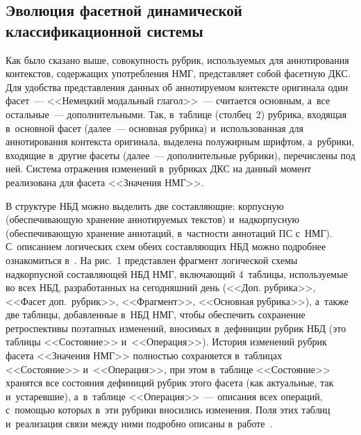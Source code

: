 \begin{multicols}{2}
\section{Эволюция фасетной динамической 
классификационной системы}

  Как было сказано выше, совокупность руб\-рик, используемых для 
аннотирования контекстов, содержащих упо\-треб\-ле\-ния НМГ, пред\-став\-ля\-ет 
собой фасетную ДКС. Для удобства представления данных об 
аннотируемом контексте оригинала один фасет~--- <<Немецкий модальный 
 глагол>>~--- считается основным, а~все остальные~--- дополнительными. 
Так, в~таблице (столбец~2) руб\-ри\-ка, входящая в~основной фасет (далее~--- 
основная руб\-ри\-ка) и~использованная для аннотирования кон\-текс\-та 
оригинала, выделена полужирным \mbox{шриф\-том}, а~руб\-ри\-ки, входящие в~другие 
фасеты (далее~--- дополнительные руб\-ри\-ки), перечислены под ней. Сис\-те\-ма 
отражения изменений в~руб\-ри\-ках ДКС на данный момент реализована для 
фасета <<Значения НМГ>>.
{

}
  
  В структуре НБД можно выделить две со\-став\-ля\-ющие: корпусную 
(обеспечивающую хранение аннотируемых текс\-тов) и~надкорпусную 
(обеспечивающую хранение аннотаций, в~част\-ности аннотаций ПС с~НМГ). 
С~описанием логических схем обеих со\-став\-ля\-ющих НБД можно подробнее 
ознакомиться в~\cite{20-go}. На рис.~1 пред\-став\-лен фрагмент логической 
схемы надкорпусной со\-став\-ля\-ющей НБД НМГ, включающий 4~таб\-ли\-цы, 
используемые во всех НБД, разработанных на сегодняшний день (<<Доп. 
рубрика>>, <<Фасет доп.\ руб\-рик>>, <<Фрагмент>>, <<Основная 
рубрика>>), а~так\-же две таб\-ли\-цы, до\-бав\-лен\-ные в~НБД НМГ, чтобы 
обеспечить сохранение ретроспективы поэтапных изменений, вносимых 
в~дефиниции рубрик НБД (это таб\-ли\-цы <<Со\-сто\-яние>> и~<<Операция>>). 
История изменений руб\-рик фасета <<Значения НМГ>> полностью 
сохраняется в~таб\-ли\-цах <<Со\-сто\-яние>> и~<<Операция>>, при этом 
в~таб\-ли\-це <<Со\-сто\-яние>> хранятся все со\-сто\-яния дефиниций руб\-рик этого 
фасета (как актуальные, так и~устаревшие), а~в~таб\-ли\-це <<Операция>>~--- 
описания всех операций, с~по\-мощью которых в~эти рубрики вносились 
изменения. Поля этих таб\-лиц и~реализация связи между ними подробно 
описаны в~работе~\cite{3-go}.
  
\begin{figure*} %
\vspace*{1pt}
  \begin{center}  
    \mbox{%
\epsfxsize=161.76mm
}


\end{center}
\end{figure*}
\end{multicols}
